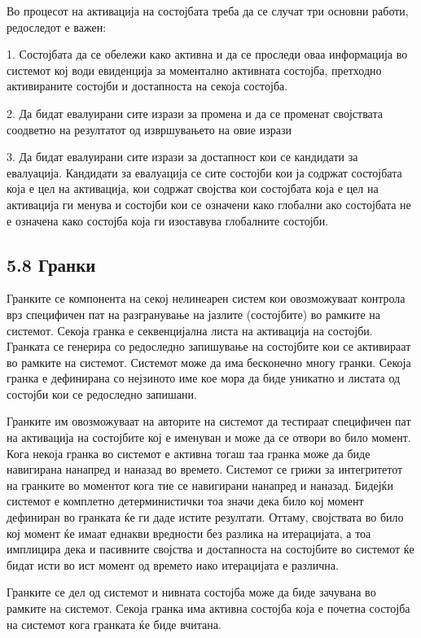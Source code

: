 Во процесот на активација на состојбата треба да се случат три основни работи, редоследот е важен:

1. Состојбата да се обележи како активна и да се проследи оваа информација во системот кој води евиденција за моментално активната состојба, претходно активираните состојби и достапноста на секоја состојба.

2. Да бидат евалуирани сите изрази за промена и да се променат својствата соодветно на резултатот од извршувањето на овие изрази

3. Да бидат евалуирани сите изрази за достапност кои се кандидати за евалуација. Кандидати за евалуација се сите состојби кои ја содржат состојбата која е цел на активација, кои содржат својства кои состојбата која е цел на активација ги менува и состојби кои се означени како глобални ако состојбата не е означена како состојба која ги изоставува глобалните состојби.

\subsection{5.8 Гранки}

Гранките се компонента на секој нелинеарен систем кои овозможуваат контрола врз специфичен пат на разгранување на јазлите (состојбите) во рамките на системот. Секоја гранка е секвенцијална листа на активација на состојби. Гранката се генерира со редоследно запишување на состојбите кои се активираат во рамките на системот. Системот може да има бесконечно многу гранки. Секоја гранка е дефинирана со нејзиното име кое мора да биде уникатно и листата од состојби кои се редоследно запишани.

Гранките им овозможуваат на авторите на системот да тестираат специфичен пат на активација на состојбите кој е именуван и може да се отвори во било момент. Кога некоја гранка во системот е активна тогаш таа гранка може да биде навигирана нанапред и наназад во времето. Системот се грижи за интегритетот на гранките во моментот кога тие се навигирани нанапред и наназад. Бидејќи системот е комплетно детерминистички тоа значи дека било кој момент дефиниран во гранката ќе ги даде истите резултати. Оттаму, својствата во било кој момент ќе имаат еднакви вредности без разлика на итерацијата, а тоа имплицира дека и пасивните својства и достапноста на состојбите во системот ќе бидат исти во ист момент од времето иако итерацијата е различна.

Гранките се дел од системот и нивната состојба може да биде зачувана во рамките на системот. Секоја гранка има активна состојба која е почетна состојба на системот кога гранката ќе биде вчитана.

